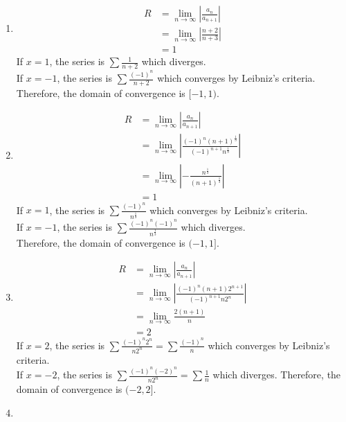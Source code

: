 \documentclass[fleqn, a4paper, 12pt, oneside]{amsart}
\theoremstyle{definition}
\theoremstyle{theorem}
\begin{document}
\begin{solution}
	\begin{enumerate}[leftmargin = *]
		\item
			\begin{align*}
				R &= \lim\limits_{n \to \infty} \left| \frac{a_n}{a_{n + 1}} \right|\\
				&= \lim\limits_{n \to \infty} \left| \frac{n + 2}{n + 3} \right|\\
				&= 1
			\end{align*}
			If $x = 1$, the series is $\sum \frac{1}{n + 2}$ which diverges.\\
			If $x = -1$, the series is $\sum \frac{(-1)^n}{n + 2}$ which converges by Leibniz's criteria.\\
			Therefore, the domain of convergence is $[-1,1)$.
		\item
			\begin{align*}
				R &= \lim\limits_{n \to \infty} \left| \frac{a_n}{a_{n + 1}} \right|\\
				&= \lim\limits_{n \to \infty} \left| \frac{(-1)^n (n + 1)^{\frac{1}{3}}}{(-1)^{n + 1} n^{\frac{1}{3}}} \right|\\
				&= \lim\limits_{n \to \infty} \left| -\frac{n^{\frac{1}{3}}}{(n + 1)^{\frac{1}{3}}} \right|\\
				&= 1
			\end{align*}
			If $x = 1$, the series is $\sum \frac{(-1)^n}{n^{\frac{1}{3}}}$ which converges by Leibniz's criteria.\\
			If $x = -1$, the series is $\sum \frac{(-1)^n (-1)^n}{n^{\frac{1}{3}}}$ which diverges.\\
			Therefore, the domain of convergence is $(-1,1]$.
		\item
			\begin{align*}
				R &= \lim\limits_{n \to \infty} \left| \frac{a_n}{a_{n + 1}} \right|\\
				&= \lim\limits_{n \to \infty} \left| \frac{(-1)^n (n + 1) 2^{n + 1}}{(-1)^{n + 1} n 2^n} \right|\\
				&= \lim\limits_{n \to \infty} \frac{2 (n + 1)}{n}\\
				&= 2
			\end{align*}
			If $x = 2$, the series is $\sum \frac{(-1)^n 2^n}{n 2^n} = \sum \frac{(-1)^n}{n}$ which converges by Leibniz's criteria.\\
			If $x = -2$, the series is $\sum \frac{(-1)^n (-2)^n}{n 2^n} = \sum \frac{1}{n}$ which diverges.
			Therefore, the domain of convergence is $(-2,2]$.
		\item

\end{enumerate}
\end{solution}
\end{document}
